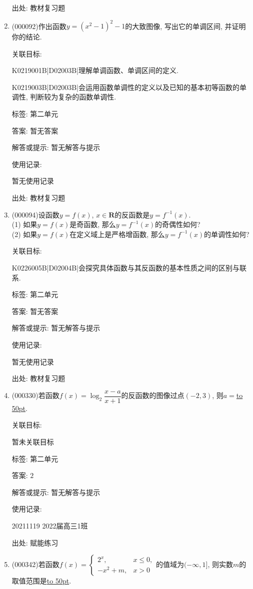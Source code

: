 \documentclass[10pt,a4paper]{article}
\newcommand{\blank}[1]{\underline{\hbox to #1pt{}}}
\begin{document}
\begin{enumerate}[1.]
出处: 教材复习题
\item { (000092)}作出函数$y=(x^2-1)^2-1$的大致图像, 写出它的单调区间, 并证明你的结论.


关联目标:

K0219001B|D02003B|理解单调函数、单调区间的定义.

K0219003B|D02003B|会运用函数单调性的定义以及已知的基本初等函数的单调性, 判断较为复杂的函数单调性.



标签: 第二单元

答案: 暂无答案

解答或提示: 暂无解答与提示

使用记录:

暂无使用记录


出处: 教材复习题
\item { (000094)}设函数$y=f(x)$, $x\in \mathbf{R}$的反函数是$y=f^{-1}(x)$.\\
(1) 如果$y=f(x)$是奇函数, 那么$y=f^{-1}(x)$的奇偶性如何?\\
(2) 如果$y=f(x)$在定义域上是严格增函数, 那么$y=f^{-1}(x)$的单调性如何?


关联目标:

K0226005B|D02004B|会探究具体函数与其反函数的基本性质之间的区别与联系.



标签: 第二单元

答案: 暂无答案

解答或提示: 暂无解答与提示

使用记录:

暂无使用记录


出处: 教材复习题
\item { (000330)}若函数$f(x)=\log_2\dfrac{x-a}{x+1}$的反函数的图像过点$(-2,3)$, 则$a=$\blank{50}.


关联目标:

暂未关联目标



标签: 第二单元

答案: $2$

解答或提示: 暂无解答与提示

使用记录:

20211119	2022届高三1班	


出处: 赋能练习
\item { (000342)}若函数$f(x)=\begin{cases}    2^x, & x\le 0, \\ -x^2+m, & x>0 \end{cases}$的值域为$(-\infty ,1]$, 则实数$m$的取值范围是\blank{50}.



\end{enumerate}
\end{document}

